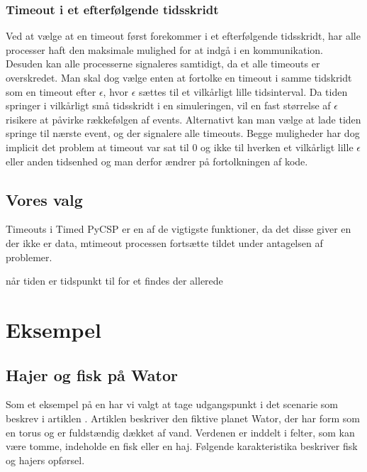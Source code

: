 \subsubsection{Timeout i et efterfølgende tidsskridt} Ved at vælge at
en timeout først forekommer i et efterfølgende tidsskridt, har alle
processer haft den maksimale mulighed for at indgå i en kommunikation.
Desuden kan alle processerne signaleres samtidigt, da et alle timeouts
er overskredet. Man skal dog vælge enten at fortolke en timeout i samme
tidskridt som en timeout efter $\epsilon$, hvor $\epsilon$ sættes til
et vilkårligt lille tidsinterval. Da tiden springer i vilkårligt små
tidsskridt i en simuleringen, vil en fast størrelse af $\epsilon$
risikere at påvirke rækkefølgen af events. Alternativt kan man vælge
at lade tiden springe til nærste event, og der signalere alle timeouts.
Begge muligheder har dog implicit det problem at timeout var sat til
0 og ikke til hverken et vilkårligt lille $\epsilon$ eller anden
tidsenhed og man derfor ændrer på fortolkningen af kode.

\subsection{Vores valg}

Timeouts i Timed PyCSP er en af de vigtigste funktioner, da det disse
giver en der ikke er data, mtimeout processen fortsætte tildet under
antagelsen af problemer.

når tiden er tidspunkt til for et findes der allerede 



\section{Eksempel}


\subsection{Hajer og fisk på Wator} Som et eksempel på en \des har vi valgt at 
tage  udgangspunkt i det scenarie som \citeauthor{wator}
beskrev i artiklen \cite{wator}.  Artiklen beskriver den
fiktive planet Wator, der har form som en torus og er fuldstændig
dækket af vand. Verdenen er inddelt i felter, som kan være tomme, indeholde en
fisk eller en haj\cite[20]{wator}. Følgende karakteristika beskriver fisk og hajers
opførsel.

